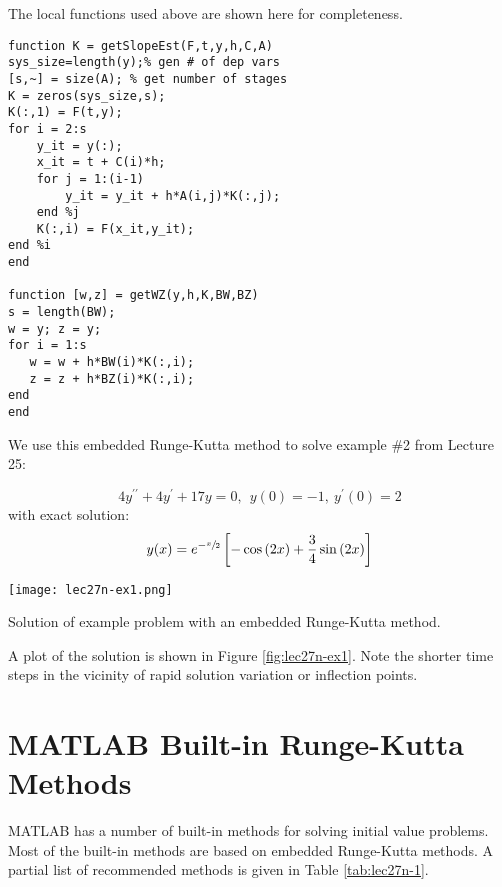 The local functions used above are shown here for completeness.
\begin{lstlisting}[style=myMatlab,name=lec27n-1]
function K = getSlopeEst(F,t,y,h,C,A)
sys_size=length(y);% gen # of dep vars
[s,~] = size(A); % get number of stages
K = zeros(sys_size,s);
K(:,1) = F(t,y);
for i = 2:s
    y_it = y(:);
    x_it = t + C(i)*h;
    for j = 1:(i-1)
        y_it = y_it + h*A(i,j)*K(:,j);
    end %j    
    K(:,i) = F(x_it,y_it);
end %i
end

function [w,z] = getWZ(y,h,K,BW,BZ)
s = length(BW);
w = y; z = y;
for i = 1:s
   w = w + h*BW(i)*K(:,i);
   z = z + h*BZ(i)*K(:,i);
end
end
\end{lstlisting}
We use this embedded Runge-Kutta method to solve example \#2 from Lecture 25:

\begin{equation*}
4y^{\prime \prime}+4y^{\prime} + 17y=0, \ \ y(0)=-1, \ y^{\prime}(0)=2
\end{equation*}
with exact solution:
\begin{equation*}
y(x)=e^{-\sfrac{x}{2}}\left[-\cos{(2x)}+\frac{3}{4}\sin{(2x)} \right]
\end{equation*}
\begin{marginfigure}
\texttt{[image: lec27n-ex1.png]}
\caption{Solution of example problem with an embedded Runge-Kutta method.}
\label{fig:lec27n-ex1}
\end{marginfigure}
A plot of the solution is shown in Figure \ref{fig:lec27n-ex1}.  Note the shorter time steps in the vicinity of rapid solution variation or inflection points.

\section{MATLAB Built-in Runge-Kutta Methods}

MATLAB has a number of built-in methods for solving initial value problems.  Most of the built-in methods are based on embedded Runge-Kutta methods.  A partial list of recommended methods is given in Table \ref{tab:lec27n-1}.

